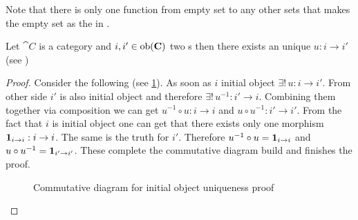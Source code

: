 \begin{example}
\label{ex:set_initial_object}
Note that there is only one function from empty set to any other sets
\cite{bib:proofwiki:Empty_Mapping_is_Unique} that makes the empty set
as the  in . 
\end{example}

\begin{theorem}
\label{thm:initial_object_unique}
Let $\cat{C}$ is a category and $i, i' \in \mathrm{ob}(\mathbf{C})$ two
s then there exists an unique
 $u: i \to i'$ (see
) 
\begin{proof}
Consider the following  (see
\cref{fig:initial_object_unique}). As soon as $i$ initial object
$\exists! \, u: i \to i'$. From other side $i'$ is also initial object
and therefore $\exists! \, u^{-1}: i' \to i$. Combining them together
via composition we can get $u^{-1} \circ u: i \to i$ and $u \circ
u^{-1}: i' \to i'$. From the fact that $i$ is initial object one can
get that there exists
only one morphism $\mathbf{1}_{ i \to i }: i \to i$. The same is the truth for $i'$.
Therefore $u^{-1} \circ u = \mathbf{1}_{ i \to i }$ and $u \circ u^{-1} = \mathbf{1}_{ i' \to i' }$.
These complete the commutative diagram build and finishes the proof. 
\begin{figure}
  \centering
  \caption{Commutative diagram for initial object uniqueness  proof}
  \label{fig:initial_object_unique}
\end{figure}
\end{proof}
\end{theorem}

